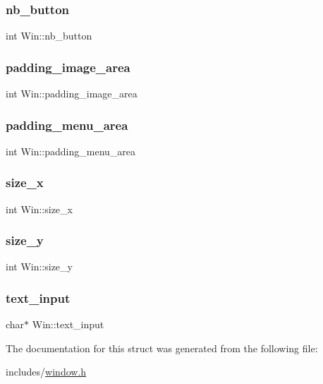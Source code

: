 \subsubsection{\texorpdfstring{nb\+\_\+button}{nb\_button}}
{\footnotesize\ttfamily int Win\+::nb\+\_\+button}

\mbox{\label{structWin_a4a7d68b7658b400c0d1f655ed86f2a07}} 
\subsubsection{\texorpdfstring{padding\+\_\+image\+\_\+area}{padding\_image\_area}}
{\footnotesize\ttfamily int Win\+::padding\+\_\+image\+\_\+area}

\mbox{\label{structWin_a42730d3dc8821c288856ee1dbd3414aa}} 
\subsubsection{\texorpdfstring{padding\+\_\+menu\+\_\+area}{padding\_menu\_area}}
{\footnotesize\ttfamily int Win\+::padding\+\_\+menu\+\_\+area}

\mbox{\label{structWin_aa0a54f7537e96b20ed7dd1e162deb5c0}} 
\subsubsection{\texorpdfstring{size\+\_\+x}{size\_x}}
{\footnotesize\ttfamily int Win\+::size\+\_\+x}

\mbox{\label{structWin_a2cef9065950b7f3f368057ba5372726b}} 
\subsubsection{\texorpdfstring{size\+\_\+y}{size\_y}}
{\footnotesize\ttfamily int Win\+::size\+\_\+y}

\mbox{\label{structWin_a17e53cd335af471a25aef8748d89185f}} 
\subsubsection{\texorpdfstring{text\+\_\+input}{text\_input}}
{\footnotesize\ttfamily char$\ast$ Win\+::text\+\_\+input}



The documentation for this struct was generated from the following file\+:\begin{DoxyCompactItemize}
\item 
includes/\hyperlink{window_8h}{window.\+h}\end{DoxyCompactItemize}

